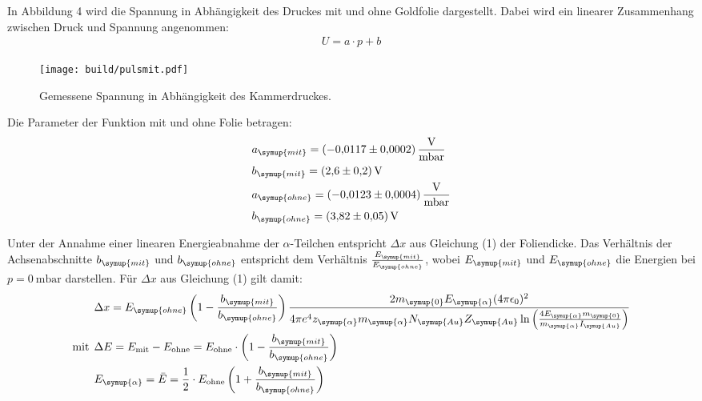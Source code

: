 In Abbildung 4 wird  die Spannung in Abhängigkeit des Druckes mit und ohne Goldfolie dargestellt. Dabei wird ein linearer
Zusammenhang zwischen Druck und Spannung angenommen:
\begin{align*}
  U = a \cdot p + b
\end{align*}

\begin{figure}[H]
  \centering
  \texttt{[image: build/pulsmit.pdf]}
  \caption{Gemessene Spannung in Abhängigkeit des Kammerdruckes.}
  \label{fig:ohn}
\end{figure}

Die Parameter der Funktion mit und ohne Folie betragen:
\begin{align*}
  &a_{\symup{mit}} = \SI{-0.0117(2)}{\volt\per\milli\bar}  \\
  &b_{\symup{mit}} = \SI{2.6(2)}{\volt}  \\
  &a_{\symup{ohne}}= \SI{-0.0123(4)}{\volt\per\milli\bar}  \\
  &b_{\symup{ohne}} = \SI{ 3.82(5)}{\volt} \\
\end{align*}

Unter der Annahme einer linearen Energieabnahme der $\alpha$-Teilchen entspricht $\Delta x$ aus Gleichung (1) der Foliendicke.
Das Verhältnis der Achsenabschnitte $b_{\symup{mit}}$ und $b_{\symup{ohne}}$ entspricht dem Verhältnis $\frac{E_{\symup{mit}}}{E_{\symup{ohne}}}$, wobei
$E_{\symup{mit}}$ und $E_{\symup{ohne}}$ die Energien bei $p=\SI{0}{\milli\bar}$ darstellen.
Für $\Delta x$ aus Gleichung (1) gilt damit:
\begin{align}
  &\Delta x = E_{\symup{ohne}} \left(1- \frac{b_{\symup{mit}}}{b_{\symup{ohne}}}\right) \frac{2 m_{\symup{0}} E_{\symup{\alpha}} (4 \pi \epsilon_0)^2}{4 \pi e^4 z_{\symup{\alpha}}  m_{\symup{\alpha}} N_{\symup{Au}} Z_{\symup{Au}} \ln{\left(\frac{4 E_{\symup{\alpha}} m_{\symup{0}}}{m_{\symup{\alpha}} I_{\symup{Au}}}\right)}} \\
  \text{mit} \:\: &\Delta E = E_{\mathrm{mit}} - E_{\mathrm{ohne}} = E_{\mathrm{ohne}} \cdot \left(1- \frac{b_{\symup{mit}}}{b_{\symup{ohne}}}\right) \\
  &E_{\symup{\alpha}} = \bar{E} = \frac{1}{2} \cdot E_{\mathrm{ohne}} \left(1+ \frac{b_{\symup{mit}}}{b_{\symup{ohne}}}\right)
\end{align}

